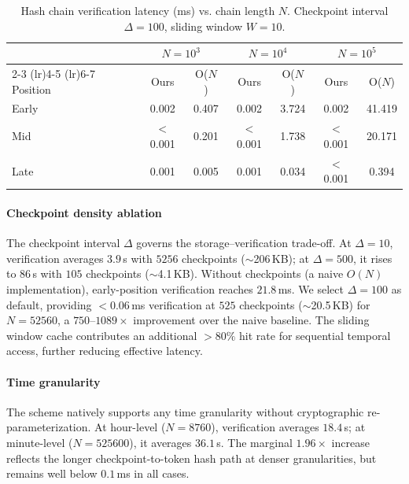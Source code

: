 \documentclass[lettersize,journal]{IEEEtran}
\begin{document}
\begin{table}[t]
    \centering
    \caption{Hash chain verification latency (ms) vs. chain length $N$. Checkpoint interval $\Delta=100$, sliding window $W=10$.}
    \label{tab:hash_chain_scaling}
    \footnotesize
    \begin{tabular}{lcccccc}
    \toprule
    & \multicolumn{2}{c}{$N=10^3$} & \multicolumn{2}{c}{$N=10^4$} & \multicolumn{2}{c}{$N=10^5$} \\
    \cmidrule(lr){2-3} \cmidrule(lr){4-5} \cmidrule(lr){6-7}
    Position & Ours & O($N$) & Ours & O($N$) & Ours & O($N$) \\
    \midrule
    Early & 0.002 & 0.407 & 0.002 & 3.724 & 0.002 & 41.419 \\
    Mid   & $<$0.001 & 0.201 & $<$0.001 & 1.738 & $<$0.001 & 20.171 \\
    Late  & 0.001 & 0.005 & 0.001 & 0.034 & $<$0.001 & 0.394 \\
    \bottomrule
    \end{tabular}
\end{table}

\paragraph{Checkpoint density ablation}
The checkpoint interval $\Delta$ governs the storage--verification trade-off. At $\Delta=10$, verification averages $3.9$\,\textmu s with $5256$ checkpoints ($\sim$206\,KB); at $\Delta=500$, it rises to $86$\,\textmu s with $105$ checkpoints ($\sim$4.1\,KB). Without checkpoints (a naive $O(N)$ implementation), early-position verification reaches $21.8$\,ms. We select $\Delta=100$ as default, providing $<0.06$\,ms verification at $525$ checkpoints ($\sim$20.5\,KB) for $N=52560$, a $750$--$1089\times$ improvement over the naive baseline. The sliding window cache contributes an additional $>80\%$ hit rate for sequential temporal access, further reducing effective latency.

\paragraph{Time granularity}
The scheme natively supports any time granularity without cryptographic re-parameterization. At hour-level ($N=8760$), verification averages $18.4$\,\textmu s; at minute-level ($N=525600$), it averages $36.1$\,\textmu s. The marginal $1.96\times$ increase reflects the longer checkpoint-to-token hash path at denser granularities, but remains well below $0.1$\,ms in all cases.
\end{document}
